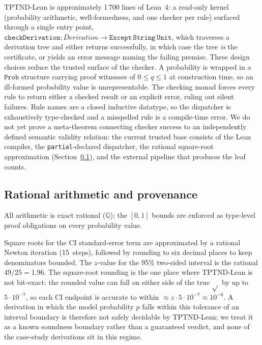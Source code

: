 \documentclass{ceurart}
\begin{document}
TPTND-Lean is approximately 1\,700 lines of Lean~4: a read-only kernel
(probability arithmetic, well-formedness, and one checker per
rule) surfaced through a single entry point,
$\texttt{checkDerivation}: \mathit{Derivation} \to
\mathtt{Except\,String\,Unit}$, which traverses a derivation tree
and either returns successfully, in which case the tree
\emph{is} the certificate, or yields an error message naming the
failing premise.
Three design choices reduce the trusted surface of the checker.
A probability is wrapped in a $\mathtt{Prob}$ structure carrying
proof witnesses of $0\le q\le 1$ at construction time, so an
ill-formed probability value is unrepresentable.  The checking
monad forces every rule to return either a checked result or an
explicit error, ruling out silent failures.  Rule names are a
closed inductive datatype, so the dispatcher is exhaustively
type-checked and a misspelled rule is a compile-time error.
We do not yet prove a meta-theorem connecting checker success to
an independently defined semantic validity relation: the current
trusted base consists of the Lean compiler, the
\texttt{partial}-declared dispatcher, the rational
square-root approximation (Section~\ref{sec:arith}), and the
external pipeline that produces the leaf counts.

\subsection{Rational arithmetic and provenance}\label{sec:arith}

All arithmetic is exact rational ($\mathbb{Q}$); the $[0,1]$
bounds are enforced as type-level proof obligations on every
probability value.

Square roots for the CI standard-error term are approximated by
a rational Newton iteration (15~steps), followed by rounding to
six decimal places to keep denominators bounded.
The $z$-value for the 95\% two-sided interval is the rational
$49/25 = 1.96$.
%
The square-root rounding is the one place where TPTND-Lean is not bit-exact:
the rounded value can fall on either side of the true $\sqrt{}$ by up to
$5\cdot10^{-7}$, so each CI endpoint is accurate to within
$\approx z \cdot 5\cdot10^{-7} \approx 10^{-6}$.
A derivation in which the model probability $p$ falls within
this tolerance of an interval boundary is therefore not safely
decidable by TPTND-Lean; we treat it as a known soundness boundary
rather than a guaranteed verdict, and none of the case-study
derivations sit in this regime.
\end{document}
